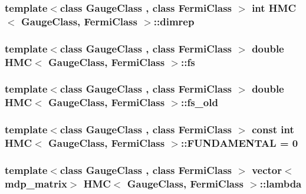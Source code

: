 \label{class_h_m_c_aa7a373acc998a08fcdc2e86dc6084b7b}
\hypertarget{class_h_m_c_a64181f9b0ebb652e395799bae2c8bfc7}{
\subsubsection[{dimrep}]{\setlength{\rightskip}{0pt plus 5cm}template$<$class GaugeClass , class FermiClass $>$ int {\bf HMC}$<$ GaugeClass, FermiClass $>$::{\bf dimrep}}}
\label{class_h_m_c_a64181f9b0ebb652e395799bae2c8bfc7}
\hypertarget{class_h_m_c_ae7be326ed9dadc4876de7f60dd683e37}{
\subsubsection[{fs}]{\setlength{\rightskip}{0pt plus 5cm}template$<$class GaugeClass , class FermiClass $>$ double {\bf HMC}$<$ GaugeClass, FermiClass $>$::{\bf fs}}}
\label{class_h_m_c_ae7be326ed9dadc4876de7f60dd683e37}
\hypertarget{class_h_m_c_a4f80874711a6599cb8c579dda6e088fb}{
\subsubsection[{fs\_\-old}]{\setlength{\rightskip}{0pt plus 5cm}template$<$class GaugeClass , class FermiClass $>$ double {\bf HMC}$<$ GaugeClass, FermiClass $>$::{\bf fs\_\-old}}}
\label{class_h_m_c_a4f80874711a6599cb8c579dda6e088fb}
\hypertarget{class_h_m_c_a5fe0965bb8e3d1220f60979189e86357}{
\subsubsection[{FUNDAMENTAL}]{\setlength{\rightskip}{0pt plus 5cm}template$<$class GaugeClass , class FermiClass $>$ const int {\bf HMC}$<$ GaugeClass, FermiClass $>$::{\bf FUNDAMENTAL} = 0}}
\label{class_h_m_c_a5fe0965bb8e3d1220f60979189e86357}
\hypertarget{class_h_m_c_a49121fbbef9d15281bc5a045fa0d07ce}{
\subsubsection[{lambda}]{\setlength{\rightskip}{0pt plus 5cm}template$<$class GaugeClass , class FermiClass $>$ vector$<${\bf mdp\_\-matrix}$>$ {\bf HMC}$<$ GaugeClass, FermiClass $>$::{\bf lambda}}}
